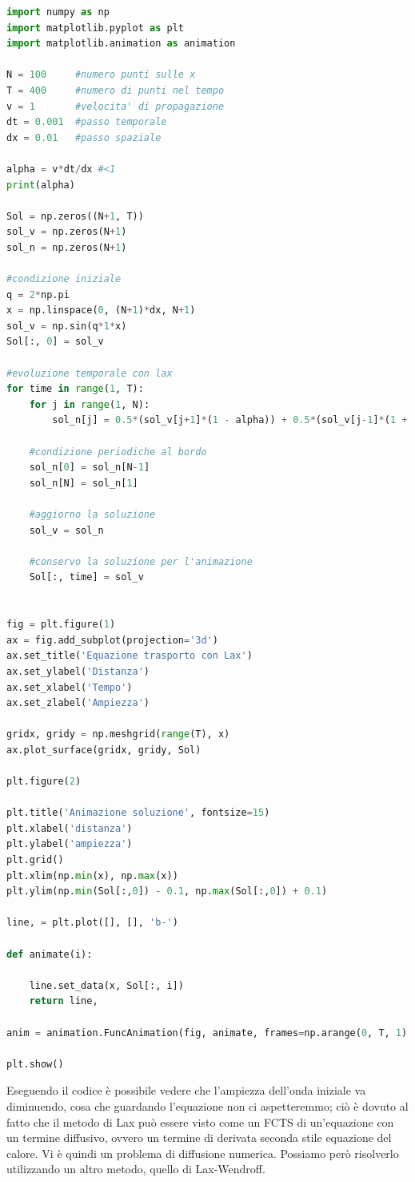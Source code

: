 \documentclass[10pt,a4paper]{article}
\begin{document}
\begin{lstlisting}[language=Python]
import numpy as np
import matplotlib.pyplot as plt
import matplotlib.animation as animation

N = 100	    #numero punti sulle x
T = 400	    #numero di punti nel tempo
v = 1       #velocita' di propagazione
dt = 0.001  #passo temporale
dx = 0.01   #passo spaziale 

alpha = v*dt/dx #<1
print(alpha)

Sol = np.zeros((N+1, T))
sol_v = np.zeros(N+1)
sol_n = np.zeros(N+1)

#condizione iniziale
q = 2*np.pi
x = np.linspace(0, (N+1)*dx, N+1)
sol_v = np.sin(q*1*x)
Sol[:, 0] = sol_v

#evoluzione temporale con lax
for time in range(1, T):
    for j in range(1, N):
        sol_n[j] = 0.5*(sol_v[j+1]*(1 - alpha)) + 0.5*(sol_v[j-1]*(1 + alpha))
      
    #condizione periodiche al bordo  
    sol_n[0] = sol_n[N-1]
    sol_n[N] = sol_n[1]
    
    #aggiorno la soluzione
    sol_v = sol_n
    
    #conservo la soluzione per l'animazione
    Sol[:, time] = sol_v
    
    
fig = plt.figure(1)
ax = fig.add_subplot(projection='3d')
ax.set_title('Equazione trasporto con Lax')
ax.set_ylabel('Distanza')
ax.set_xlabel('Tempo')
ax.set_zlabel('Ampiezza')

gridx, gridy = np.meshgrid(range(T), x)
ax.plot_surface(gridx, gridy, Sol)

plt.figure(2)

plt.title('Animazione soluzione', fontsize=15)
plt.xlabel('distanza')
plt.ylabel('ampiezza')
plt.grid()
plt.xlim(np.min(x), np.max(x))
plt.ylim(np.min(Sol[:,0]) - 0.1, np.max(Sol[:,0]) + 0.1)

line, = plt.plot([], [], 'b-')

def animate(i):
    
    line.set_data(x, Sol[:, i])
    return line,

anim = animation.FuncAnimation(fig, animate, frames=np.arange(0, T, 1) ,interval=10, blit=True, repeat=True)

plt.show()
\end{lstlisting}
Eseguendo il codice è possibile vedere che l'ampiezza dell'onda iniziale va diminuendo, cosa che guardando l'equazione non ci aspetteremmo; ciò è dovuto al fatto che il metodo di Lax può essere visto come un FCTS di un'equazione con un termine diffusivo, ovvero un termine di derivata seconda stile equazione del calore. Vi è quindi un problema di diffusione numerica. Possiamo però risolverlo utilizzando un altro metodo, quello di Lax-Wendroff.
\end{document}
